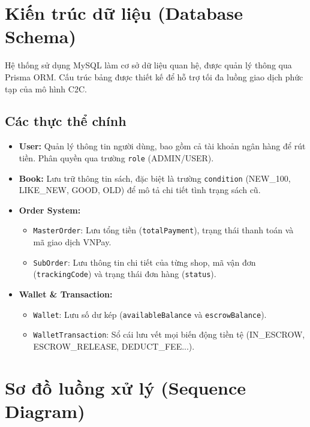 \documentclass[../main.tex]{subfiles}
\begin{document}
\section{Kiến trúc dữ liệu (Database Schema)}
Hệ thống sử dụng MySQL làm cơ sở dữ liệu quan hệ, được quản lý thông qua Prisma ORM. Cấu trúc bảng được thiết kế để hỗ trợ tối đa luồng giao dịch phức tạp của mô hình C2C.

\subsection{Các thực thể chính}
\begin{itemize}
    \item \textbf{User:} Quản lý thông tin người dùng, bao gồm cả tài khoản ngân hàng để rút tiền. Phân quyền qua trường \texttt{role} (ADMIN/USER).
    \item \textbf{Book:} Lưu trữ thông tin sách, đặc biệt là trường \texttt{condition} (NEW\_100, LIKE\_NEW, GOOD, OLD) để mô tả chi tiết tình trạng sách cũ.
    \item \textbf{Order System:} 
        \begin{itemize}
            \item \texttt{MasterOrder}: Lưu tổng tiền (\texttt{totalPayment}), trạng thái thanh toán và mã giao dịch VNPay.
            \item \texttt{SubOrder}: Lưu thông tin chi tiết của từng shop, mã vận đơn (\texttt{trackingCode}) và trạng thái đơn hàng (\texttt{status}).
        \end{itemize}
    \item \textbf{Wallet \& Transaction:} 
        \begin{itemize}
            \item \texttt{Wallet}: Lưu số dư kép (\texttt{availableBalance} và \texttt{escrowBalance}).
            \item \texttt{WalletTransaction}: Sổ cái lưu vết mọi biến động tiền tệ (IN\_ESCROW, ESCROW\_RELEASE, DEDUCT\_FEE...).
        \end{itemize}
\end{itemize}

\section{Sơ đồ luồng xử lý (Sequence Diagram)}
\end{document}
